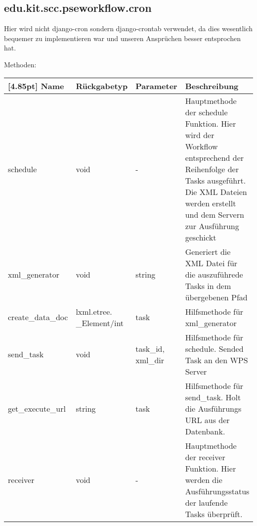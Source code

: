 	
	
    	\subsection{edu.kit.scc.pseworkflow.cron}
    	Hier wird nicht django-cron sondern django-crontab verwendet, da dies wesentlich bequemer zu implementieren war und unseren Ansprüchen besser  entsprochen hat.
    	
    			Methoden:
		\begin{center}
			\setlength\tabcolsep{5pt}
			\renewcommand{\arraystretch}{1.5}
			
			\begin{tabularx}{\textwidth}{|l|l|l|X|}
				\hline
				\rowcolor[gray]{0.90}[4.85pt]
				Name & Rückgabetyp & Parameter & Beschreibung \\ \hline
				schedule & void & - & Hauptmethode der schedule Funktion. Hier wird der Workflow entsprechend der Reihenfolge der Tasks ausgeführt. Die XML Dateien werden erstellt und dem Servern zur Ausführung geschickt \\ \hline
				xml\_generator & void & string & Generiert die XML Datei für die auszuführede Tasks in dem übergebenen Pfad \\ \hline
				create\_data\_doc & \makecell{lxml.etree.\\\_Element/int} & task & Hilfsmethode für xml\_generator \\ \hline
				send\_task & void & \makecell{task\_id, \\xml\_dir} & Hilfsmethode für schedule. Sended Task an den WPS Server \\ \hline
				get\_execute\_url & string & task & Hilfsmethode für send\_task. Holt die Ausführungs URL aus der Datenbank. \\ \hline
				receiver & void & - & Hauptmethode der receiver Funktion. Hier werden die Ausführungsstatus der laufende Tasks überprüft. 
			\end{tabularx}
		\end{center}